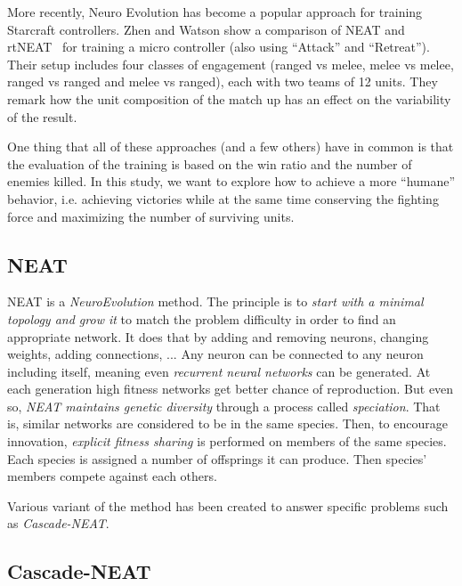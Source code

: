 More recently, Neuro Evolution has become a popular approach for
training Starcraft controllers. Zhen and Watson show a comparison of
NEAT and rtNEAT~\cite{ShWa13} for training a micro controller (also
using ``Attack'' and ``Retreat''). Their setup includes four classes
of engagement (ranged vs melee, melee vs melee, ranged vs ranged and
melee vs ranged), each with two teams of 12 units. They remark how the
unit composition of the match up has an effect on the variability of
the result.

One thing that all of these approaches (and a few others) have in
common is that the evaluation of the training is based on the win
ratio and the number of enemies killed. In this study, we want to
explore how to achieve a more ``humane'' behavior, i.e. achieving
victories while at the same time conserving the fighting force and
maximizing the number of surviving units.

\subsection{NEAT}\label{subsec:neat}

NEAT is a \emph{NeuroEvolution} method. The principle is to
\emph{start with a minimal topology and grow it} to match the problem
difficulty in order to find an appropriate network.  It does that by
adding and removing neurons, changing weights, adding connections, ...
Any neuron can be connected to any neuron including itself, meaning
even \emph{recurrent neural networks} can be generated.  At each
generation high fitness networks get better chance of
reproduction. But even so, \emph{NEAT maintains genetic diversity}
through a process called \emph{speciation}. That is, similar networks
are considered to be in the same species. Then, to encourage
innovation, \emph{explicit fitness sharing} is performed on members of
the same species. Each species is assigned a number of offsprings it
can produce. Then species' members compete against each
others. \cite{StMi02}

Various variant of the method has been created to answer specific
problems such as \emph{Cascade-NEAT}.

\subsection{Cascade-NEAT}\label{subsec:cascade-neat}

